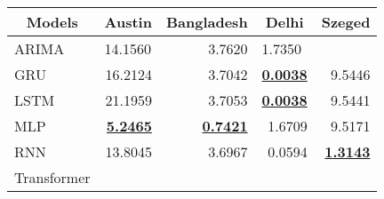\label{sec:ExpRes}

\begin{table}[]
\begin{tabular}{|l|r|r|r|r|}
\hline
\multicolumn{1}{|c|}{Models} & \multicolumn{1}{c|}{Austin}  & \multicolumn{1}{c|}{Bangladesh} & \multicolumn{1}{c|}{Delhi}  & \multicolumn{1}{c|}{Szeged} \\ \hline
ARIMA                        & \multicolumn{1}{l|}{14.1560} & 3.7620                          & \multicolumn{1}{l|}{1.7350} & \multicolumn{1}{l|}{}       \\ \hline
GRU                          & 16.2124                      & 3.7042                          & {\ul \textbf{0.0038}}       & 9.5446                      \\ \hline
LSTM                         & 21.1959                      & 3.7053                          & {\ul \textbf{0.0038}}       & 9.5441                      \\ \hline
MLP                          & {\ul \textbf{5.2465}}        & {\ul \textbf{0.7421}}           & 1.6709                      & 9.5171                      \\ \hline
RNN                          & 13.8045                      & 3.6967                          & 0.0594                      & {\ul \textbf{1.3143}}       \\ \hline
Transformer                  &                              &                                 &                             &                             \\ \hline
\end{tabular}
\end{table}